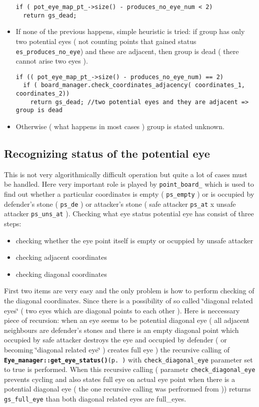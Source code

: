 \begin{itemize}
\footnotesize\begin{verbatim}if ( pot_eye_map_pt_->size() - produces_no_eye_num < 2)  
  return gs_dead;
\end{verbatim}
\normalsize
\item If none of the previous happens, simple heuristic is tried: if group has only two potential eyes ( not counting points that gained status {\tt es\_\-produces\_\-no\_\-eye}) and these are adjacent, then group is dead ( there cannot arise two eyes ). 

\footnotesize\begin{verbatim}if (( pot_eye_map_pt_->size() - produces_no_eye_num) == 2)
  if ( board_manager.check_coordinates_adjacency( coordinates_1, coordinates_2)) 
    return gs_dead; //two potential eyes and they are adjacent => group is dead
\end{verbatim}
\normalsize
\item Otherwise ( what happens in most cases ) group is stated unknown.\end{itemize}
\subsection{Recognizing status of the potential eye}\label{page_4_page_4__sec_2}
This is not very algorithmically difficult operation but quite a lot of cases must be handled. Here very important role is played by {\tt point\_\-board\_\-} which is used to find out whether a particular coordinates is empty ( {\tt ps\_\-empty} ) or is occupied by defender's stone ( {\tt ps\_\-de} ) or attacker's stone ( safe attacker {\tt ps\_\-at} x unsafe attacker {\tt ps\_\-uns\_\-at} ). Checking what eye status potential eye has consist of three steps:\begin{itemize}
\item checking whether the eye point itself is empty or ocuppied by unsafe attacker\item checking adjacent coordinates\item checking diagonal coordinates\end{itemize}


First two items are very easy and the only problem is how to perform checking of the diagonal coordinates. Since there is a possibility of so called \char`\"{}diagonal related eyes\char`\"{} ( two eyes which are diagonal points to each other ). Here is neccessary piece of recursion: when an eye seems to be potential diagonal eye ( all adjacent neighbours are defender's stones and there is an empty diagonal point which occupied by safe attacker destroys the eye and occupied by defender ( or becoming \char`\"{}diagonal related eye\char`\"{} ) creates full eye ) the recursive calling of {\tt {\bf Eye\_\-manager::get\_\-eye\_\-status()}{\rm (p.\,\pageref{classEye__manager_a0})}} with {\tt check\_\-diagonal\_\-eye} parameter set to true is performed. When this recursive calling ( parametr {\tt check\_\-diagonal\_\-eye} prevents cycling and also states full eye on actual eye point when there is a potential diagonal eye ( the one recursive calling was perfrormed from )) returns {\tt gs\_\-full\_\-eye} than both diagonal related eyes are full\_\-eyes.

